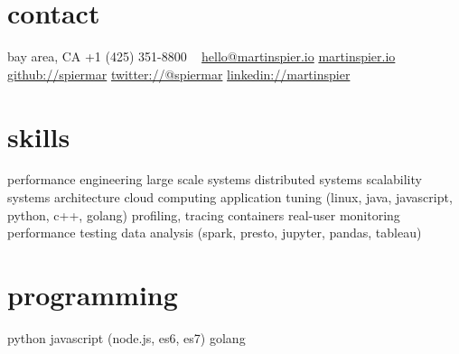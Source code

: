 \begin{aside}
    \section{contact}
        bay area, CA
        +1 (425) 351-8800
        ~
        \href{mailto:hello@martinspier.io}{hello@martinspier.io}
        \href{http://martinspier.io}{martinspier.io}
        \href{https://github.com/spiermar}{github://spiermar}
        \href{https://twitter.com/spiermar}{twitter://@spiermar}
        \href{https://www.linkedin.com/in/martinspier}{linkedin://martinspier}
    \section{skills}
        performance engineering
        large scale systems
        distributed systems
        scalability
        systems architecture
        cloud computing
        application tuning
        (linux, java, javascript, python, c++, golang)
        profiling, tracing
        containers
        real-user monitoring
        performance testing
        data analysis
        (spark, presto, jupyter, pandas, tableau)
        \section{programming}
        python
        javascript
        (node.js, es6, es7)
        golang
\end{aside}